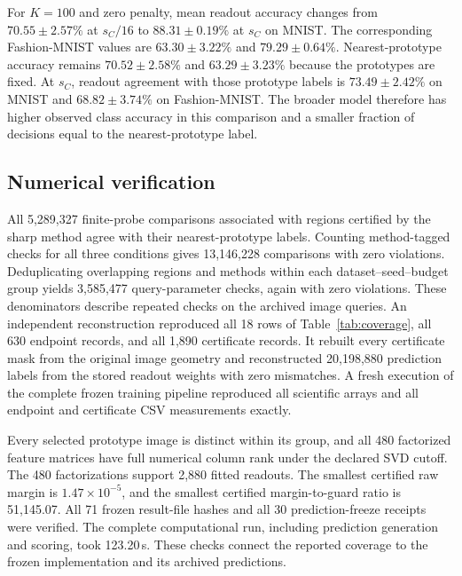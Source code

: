 For $K=100$ and zero penalty, mean readout accuracy changes from $70.55\pm2.57\%$ at $s_C/16$ to $88.31\pm0.19\%$ at $s_C$ on MNIST. The corresponding Fashion-MNIST values are $63.30\pm3.22\%$ and $79.29\pm0.64\%$. Nearest-prototype accuracy remains $70.52\pm2.58\%$ and $63.29\pm3.23\%$ because the prototypes are fixed. At $s_C$, readout agreement with those prototype labels is $73.49\pm2.42\%$ on MNIST and $68.82\pm3.74\%$ on Fashion-MNIST. The broader model therefore has higher observed class accuracy in this comparison and a smaller fraction of decisions equal to the nearest-prototype label.

\subsection{Numerical verification}
All 5,289,327 finite-probe comparisons associated with regions certified by the sharp method agree with their nearest-prototype labels. Counting method-tagged checks for all three conditions gives 13,146,228 comparisons with zero violations. Deduplicating overlapping regions and methods within each dataset--seed--budget group yields 3,585,477 query-parameter checks, again with zero violations. These denominators describe repeated checks on the archived image queries. An independent reconstruction reproduced all 18 rows of Table~\ref{tab:coverage}, all 630 endpoint records, and all 1,890 certificate records. It rebuilt every certificate mask from the original image geometry and reconstructed 20,198,880 prediction labels from the stored readout weights with zero mismatches. A fresh execution of the complete frozen training pipeline reproduced all scientific arrays and all endpoint and certificate CSV measurements exactly.

Every selected prototype image is distinct within its group, and all 480 factorized feature matrices have full numerical column rank under the declared SVD cutoff. The 480 factorizations support 2,880 fitted readouts. The smallest certified raw margin is $1.47\times10^{-5}$, and the smallest certified margin-to-guard ratio is 51,145.07. All 71 frozen result-file hashes and all 30 prediction-freeze receipts were verified. The complete computational run, including prediction generation and scoring, took 123.20\,s. These checks connect the reported coverage to the frozen implementation and its archived predictions.

